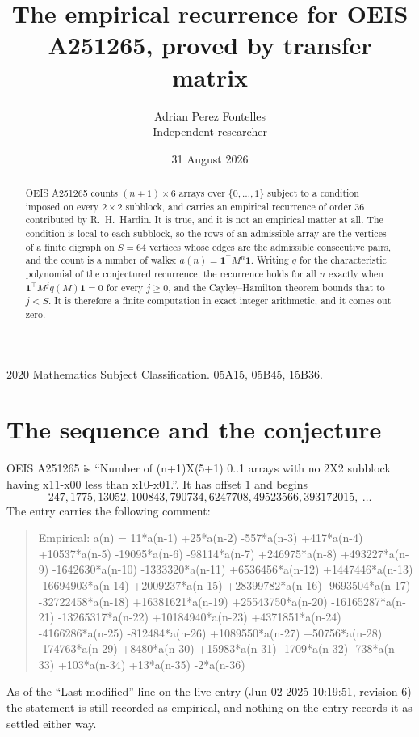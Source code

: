 \documentclass[11pt,a4paper]{article}
\title{The empirical recurrence for OEIS A251265, proved by transfer matrix}
\author{Adrian Perez Fontelles\\ \small Independent researcher}
\date{31 August 2026}
\theoremstyle{plain}
\theoremstyle{definition}
\begin{document}
\maketitle

\begin{abstract}
OEIS A251265 counts $(n+1)\times6$ arrays over $\{0,\dots,1\}$ subject to a condition imposed on
every $2\times2$ subblock, and carries an empirical recurrence of order $36$ contributed
by R.~H.~Hardin. It is true, and it is not an empirical matter at all. The condition is local
to each subblock, so the rows of an admissible array are the vertices of a finite digraph
on $S=64$ vertices whose edges are the admissible consecutive pairs, and the count is a
number of walks: $a(n)=\mathbf{1}^{\!\top}M^{n}\mathbf{1}$. Writing $q$
for the characteristic polynomial of the conjectured recurrence, the recurrence holds for all
$n$ exactly when $\mathbf{1}^{\!\top}M^{j}q(M)\mathbf{1}=0$ for every $j\ge0$, and the
Cayley--Hamilton theorem bounds that to $j<S$. It is therefore a finite computation in exact
integer arithmetic, and it comes out zero.
\end{abstract}

\noindent\small 2020 Mathematics Subject Classification. 05A15, 05B45, 15B36.\normalsize

\section{The sequence and the conjecture}

OEIS A251265 is ``Number of (n+1)X(5+1) 0..1 arrays with no 2X2 subblock having x11-x00 less than x10-x01.''. It has offset $1$ and begins
\[
247, 1775, 13052, 100843, 790734, 6247708, 49523566, 393172015,\ \dots
\]
The entry carries the following comment:
\begin{quote}\small
Empirical: a(n) = 11*a(n-1) +25*a(n-2) -557*a(n-3) +417*a(n-4) +10537*a(n-5) -19095*a(n-6) -98114*a(n-7) +246975*a(n-8) +493227*a(n-9) -1642630*a(n-10) -1333320*a(n-11) +6536456*a(n-12) +1447446*a(n-13) -16694903*a(n-14) +2009237*a(n-15) +28399782*a(n-16) -9693504*a(n-17) -32722458*a(n-18) +16381621*a(n-19) +25543750*a(n-20) -16165287*a(n-21) -13265317*a(n-22) +10184940*a(n-23) +4371851*a(n-24) -4166286*a(n-25) -812484*a(n-26) +1089550*a(n-27) +50756*a(n-28) -174763*a(n-29) +8480*a(n-30) +15983*a(n-31) -1709*a(n-32) -738*a(n-33) +103*a(n-34) +13*a(n-35) -2*a(n-36)
\end{quote}
As of the ``Last modified'' line on the live entry (Jun 02 2025 10:19:51, revision 6) the statement is
still recorded as empirical, and nothing on the entry records it as settled either way.
\end{document}
